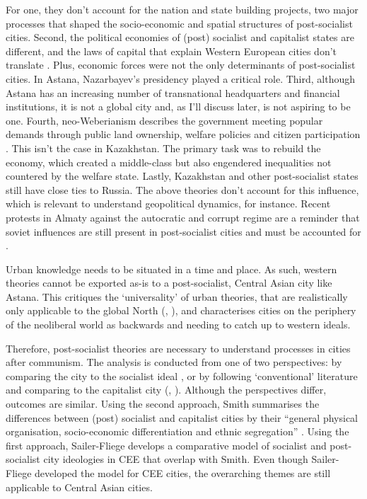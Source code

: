 \documentclass{article}
\begin{document}
For one, they don't account for the nation and state building projects, two major processes that shaped the socio-economic and spatial structures of post-socialist cities.
Second, the political economies of (post) socialist and capitalist states are different, and the laws of capital that explain Western European cities don't translate \parencite{hirt2013whatever}. Plus, economic forces were not the only determinants of post-socialist cities. In Astana, Nazarbayev's presidency played a critical role.
Third, although Astana has an increasing number of transnational headquarters and financial institutions, it is not a global city and, as I'll discuss later, is not aspiring to be one.
Fourth, neo-Weberianism describes the government meeting popular demands through public land ownership, welfare policies and citizen participation \parencite{haussermann2005european}. This isn't the case in Kazakhstan. The primary task was to rebuild the economy, which created a middle-class but also engendered inequalities not countered by the welfare state.
Lastly, Kazakhstan and other post-socialist states still have close ties to Russia. The above theories don't account for this influence, which is relevant to understand geopolitical dynamics, for instance. Recent protests in Almaty against the autocratic and corrupt regime are a reminder that soviet influences are still present in post-socialist cities and must be accounted for \parencite{nytimes2022protests}.

Urban knowledge needs to be situated in a time and place. As such, western theories cannot be exported as-is to a post-socialist, Central Asian city like Astana. This critiques the `universality' of urban theories, that are realistically only applicable to the global North (\cite{ferenvcuhova2016accounts}, \cite{robinson2013ordinary}), and characterises cities on the periphery of the neoliberal world as backwards and needing to catch up to western ideals.

Therefore, post-socialist theories are necessary to understand processes in cities after communism. The analysis is conducted from one of two perspectives: by comparing the city to the socialist ideal \parencite{sailer1999characteristics}, or by following `conventional' literature and comparing to the capitalist city (\cite{smith1996socialist}, \cite{haussermann1996socialist}). Although the perspectives differ, outcomes are similar. Using the second approach, Smith summarises the differences between (post) socialist and capitalist cities by their ``general physical organisation, socio-economic differentiation and ethnic segregation'' \parencite{smith1996socialist}. Using the first approach, Sailer-Fliege develops a comparative model of socialist and post-socialist city ideologies in CEE that overlap with Smith. Even though Sailer-Fliege developed the model for CEE cities, the overarching themes are still applicable to Central Asian cities.
\end{document}
